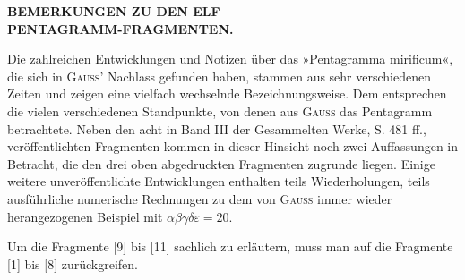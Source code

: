 \clearpage{}
\begin{center}\bfseries BEMERKUNGEN ZU DEN ELF\\PENTAGRAMM-FRAGMENTEN.\end{center}

Die zahlreichen Entwicklungen und Notizen über das »Pentagramma mirificum«, die sich in
\textsc{Gauss}' Nachlass gefunden haben, stammen aus sehr verschiedenen Zeiten und zeigen eine
vielfach wechselnde Bezeichnungsweise. Dem entsprechen die vielen verschiedenen
Standpunkte, von denen aus \textsc{Gauss} das Pentagramm betrachtete. Neben den acht in
Band III der Gesammelten Werke, S. 481 ff., veröffentlichten Fragmenten kommen in dieser Hinsicht noch
zwei Auffassungen in Betracht, die den drei oben abgedruckten Fragmenten
zugrunde liegen. Einige weitere unveröffentlichte Entwicklungen enthalten teils
Wiederholungen, teils ausführliche numerische Rechnungen zu dem von \textsc{Gauss} immer wieder
herangezogenen Beispiel mit $\alpha\beta\gamma\delta\varepsilon = 20$.

Um die Fragmente [9] bis [11] sachlich zu erläutern, muss man auf die
Fragmente [1] bis [8] zurückgreifen.

